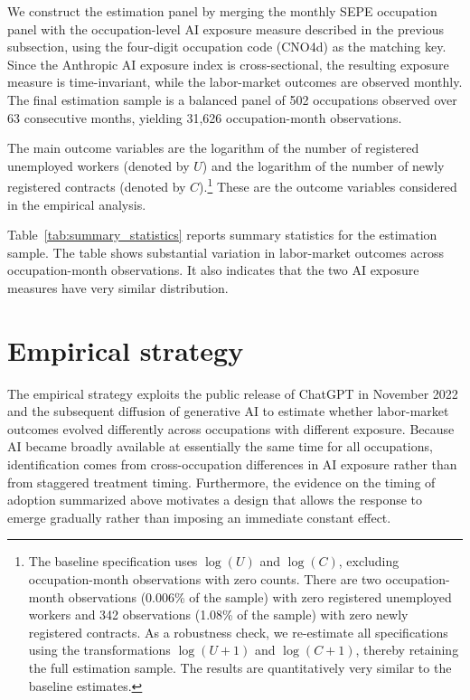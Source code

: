 We construct the estimation panel by merging the monthly SEPE occupation panel with the occupation-level AI exposure measure described in the previous subsection, using the four-digit occupation code (CNO4d) as the matching key. Since the Anthropic AI exposure index is cross-sectional, the resulting exposure measure is time-invariant, while the labor-market outcomes are observed monthly. The final estimation sample is a balanced panel of 502 occupations observed over 63 consecutive months, yielding 31,626 occupation-month observations.

The main outcome variables are the logarithm of the number of registered unemployed workers (denoted by $U$) and the logarithm of the number of newly registered contracts (denoted by $C$).\footnote{The baseline specification uses $\log(U)$ and $\log(C)$, excluding occupation-month observations with zero counts. There are two occupation-month observations (0.006\% of the sample) with zero registered unemployed workers and 342 observations (1.08\% of the sample) with zero newly registered contracts. As a robustness check, we re-estimate all specifications using the transformations $\log(U+1)$ and $\log(C+1)$, thereby retaining the full estimation sample. The results are quantitatively very similar to the baseline estimates.} These are the outcome variables considered in the empirical analysis. 

Table~\ref{tab:summary_statistics} reports summary statistics for the estimation sample. The table shows substantial variation in labor-market outcomes across occupation-month observations. It also indicates that the two AI exposure measures have very similar distribution.

\clearpage



\section{Empirical strategy}
\label{sec:empirical_strategy}

The empirical strategy exploits the public release of ChatGPT in November 2022 and the subsequent diffusion of generative AI to estimate whether labor-market outcomes evolved differently across occupations with different exposure. Because AI became broadly available at essentially the same time for all occupations, identification comes from cross-occupation differences in AI exposure rather than from staggered treatment timing. Furthermore, the evidence on the timing of adoption summarized above motivates a design that allows the response to emerge gradually rather than imposing an immediate constant effect.

